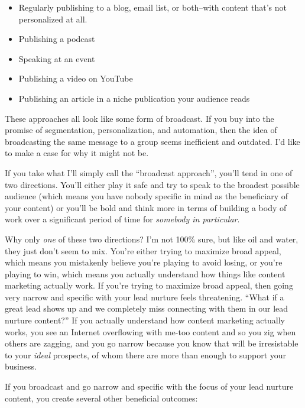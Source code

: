 \begin{itemize}
\item Regularly publishing to a blog, email list, or both--with content that's not personalized at all.
\item Publishing a podcast
\item Speaking at an event
\item Publishing a video on YouTube
\item Publishing an article in a niche publication your audience reads
\end{itemize}

These approaches all look like some form of broadcast. If you buy into the promise of segmentation, personalization, and automation, then the idea of broadcasting the same message to a group seems inefficient and outdated. I'd like to make a case for why it might not be.

If you take what I'll simply call the ``broadcast approach'', you'll tend in one of two directions. You'll either play it safe and try to speak to the broadest possible audience (which means you have nobody specific in mind as the beneficiary of your content) or you'll be bold and think more in terms of building a body of work over a significant period of time for \emph{somebody in particular}.

Why only \emph{one} of these two directions? I'm not 100\% sure, but like oil and water, they just don't seem to mix. You're either trying to maximize broad appeal, which means you mistakenly believe you're playing to avoid losing, or you're playing to win, which means you actually understand how things like content marketing actually work. If you're trying to maximize broad appeal, then going very narrow and specific with your lead nurture feels threatening. ``What if a great lead shows up and we completely miss connecting with them in our lead nurture content?'' If you actually understand how content marketing actually works, you see an Internet overflowing with me-too content and so you zig when others are zagging, and you go narrow because you know that will be irresistable to your \emph{ideal} prospects, of whom there are more than enough to support your business.

If you broadcast and go narrow and specific with the focus of your lead nurture content, you create several other beneficial outcomes:

